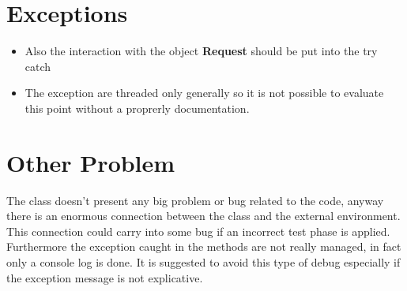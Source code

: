 \section{Exceptions}
\begin{itemize}
    \begin{itemize}
      \item Also the interaction with the object \textbf{Request} should be put into the try catch
    \end{itemize}
    \begin{itemize}
      \item The exception are threaded only generally so it is not possible to evaluate this point without a proprerly
      documentation.
    \end{itemize}
\end{itemize}

\section{Other Problem}
The class doesn't present any big problem or bug related to the code, anyway there is an enormous connection between the
class and the external environment. This connection could carry into some bug if an incorrect test phase is applied.
Furthermore the exception caught in the methods are not really managed, in fact only a console log is done. It is suggested
to avoid this type of debug especially if the exception message is not explicative.
